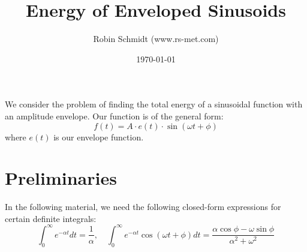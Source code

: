 \title{Energy of Enveloped Sinusoids}
\author{Robin Schmidt (www.rs-met.com)}
\date{\today}
\maketitle

We consider the problem of finding the total energy of a sinusoidal function with an amplitude envelope. Our function is of the general form:
\begin{equation}
 f(t) = A \cdot e(t) \cdot \sin(\omega t + \phi)
\end{equation}
where $e(t)$ is our envelope function.

\section{Preliminaries}
In the following material, we need the following closed-form expressions for certain definite integrals:
\begin{equation}
\label{Eq:Integrals}
 \int_0^{\infty} e^{-\alpha t} dt = \frac{1}{\alpha}, \quad
 \int_0^{\infty} e^{-\alpha t} \cos(\omega t + \phi) dt = \frac{\alpha \cos \phi - \omega \sin \phi}{\alpha^2 + \omega^2}
\end{equation}

